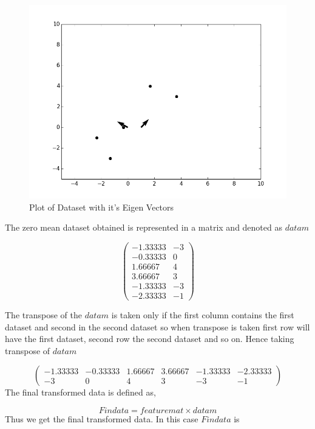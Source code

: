 \documentclass[a4paper]{article}
\begin{document}
\begin{figure}[!htbp]
   \centering
   \includegraphics[scale = 0.5]{fig3.png} %
   \caption{Plot of Dataset with it's Eigen Vectors}\label{c}
   \label{fig:example}
\end{figure}
\parskip 0pt 
The zero mean dataset obtained is represented in a matrix and denoted as $datam$

$$\begin{pmatrix}
 -1.33333 & -3 \\
-0.33333 & 0 \\
1.66667 & 4 \\
3.66667 & 3 \\
-1.33333 & -3 \\
-2.33333 & -1   \end{pmatrix}$$

The transpose of the $datam$ is taken only if the first column contains the first dataset and second in the second dataset so when transpose is taken first row will have the first dataset, second row the second dataset and so on. Hence taking transpose of $datam$

$$\begin{pmatrix}
 -1.33333 & -0.33333 &1.66667 &3.66667 &-1.33333 &-2.33333 \\ -3 & 0& 4 & 3 &-3 &-1   \end{pmatrix}$$
\parskip 0pt 
The final transformed data is defined as,

$$Findata = featuremat \times datam$$
\parskip 0pt 
Thus we get the final transformed data.
In this case $Findata$ is
\end{document}
